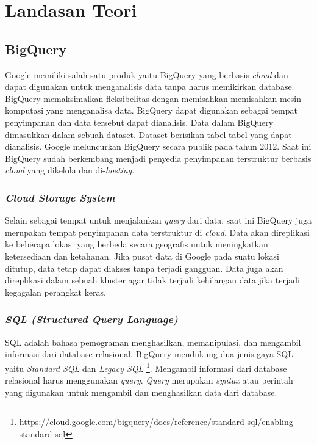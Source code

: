 \chapter{Landasan Teori}
\label{chap:teori}

\section{BigQuery\cite{bqa, bqIntroduction}}
Google memiliki salah satu produk yaitu BigQuery yang berbasis \textit{cloud} dan dapat digunakan untuk menganalisis data tanpa harus memikirkan database. BigQuery memaksimalkan fleksibelitas dengan memisahkan memisahkan mesin komputasi yang menganalisa data. BigQuery dapat digunakan sebagai tempat penyimpanan dan data tersebut dapat dianalisis. Data dalam BigQuery dimasukkan dalam sebuah dataset. Dataset berisikan tabel-tabel yang dapat dianalisis. Google meluncurkan BigQuery secara publik pada tahun 2012. Saat ini BigQuery sudah berkembang menjadi penyedia penyimpanan terstruktur berbasis \textit{cloud} yang dikelola dan di-\textit{hosting}. 

\subsection{\textit{Cloud Storage System}}
Selain sebagai tempat untuk menjalankan \textit{query} dari data, saat ini BigQuery juga merupakan tempat penyimpanan data terstruktur di \textit{cloud}. Data akan direplikasi ke beberapa lokasi yang berbeda secara geografis untuk meningkatkan ketersediaan dan ketahanan. Jika pusat data di Google pada suatu lokasi ditutup, data tetap dapat diakses tanpa terjadi gangguan. Data juga akan direplikasi dalam sebuah kluster agar tidak terjadi kehilangan data jika terjadi kegagalan perangkat keras. 

\subsection{\textit{SQL (Structured Query Language) \cite{book:22611}}}
SQL adalah bahasa pemograman menghasilkan, memanipulasi, dan mengambil informasi dari database relasional. BigQuery mendukung dua jenis gaya SQL yaitu \textit{Standard SQL} dan \textit{Legacy SQL} \footnote{https://cloud.google.com/bigquery/docs/reference/standard-sql/enabling-standard-sql}. Mengambil informasi dari database relasional harus menggunakan \textit{query}. \textit{Query} merupakan \textit{syntax} atau perintah yang digunakan untuk mengambil dan menghasilkan data dari database.

